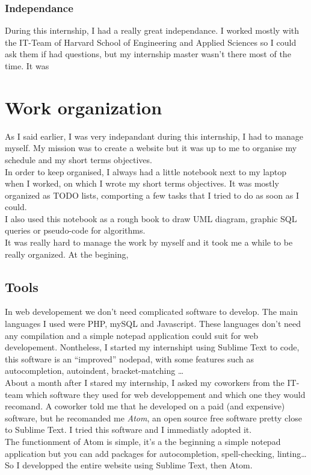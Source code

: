 \documentclass[10pt,a4paper]{article}
\newcommand{\hseas}{Harvard School of Engineering and Applied Sciences}
\begin{document}
\subsubsection*{Independance}
During this internship, I had a really great independance. I worked mostly with the IT-Team of \hseas{} so I could ask them if had questions, but my internship master wasn't there most of the time. It was


\section{Work organization}
As I said earlier, I was very indepandant during this internship, I had to manage myself. My mission was to create a website but it was up to me to organise my schedule and my short terms objectives.\\
In order to keep organised, I always had a little notebook next to my laptop when I worked, on which I wrote my short terms objectives. It was mostly organized as TODO lists, comporting a few tasks that I tried to do as soon as I could.\\
I also used this notebook as a rough book to draw UML diagram, graphic SQL queries or pseudo-code for algorithms.\\

It was really hard to manage the work by myself and it took me a while to be really organized. At the begining, %

\subsection{Tools}

In web developement we don't need complicated software to develop. The main languages I used were PHP, mySQL and Javascript. These languages don't need any compilation and a simple notepad application could suit for web developement. Nontheless, I started my internshipt using Sublime Text to code, this software is an ``improved'' nodepad, with some features such as autocompletion, autoindent, bracket-matching \ldots \\
About a month after I stared my internship, I asked my coworkers from the IT-team which software they used for web developpement and which one they would recomand. A coworker told me that he developed on a paid (and expensive) software, but he recomanded me \textit{Atom}, an open source free software pretty close to Sublime Text. I tried this software and I immediatly adopted it.\\
The functionment of Atom is simple, it's a the beginning a simple notepad application but you can add packages for autocompletion, spell-checking, linting\ldots \\
So I developped the entire website using Sublime Text, then Atom.
\end{document}
